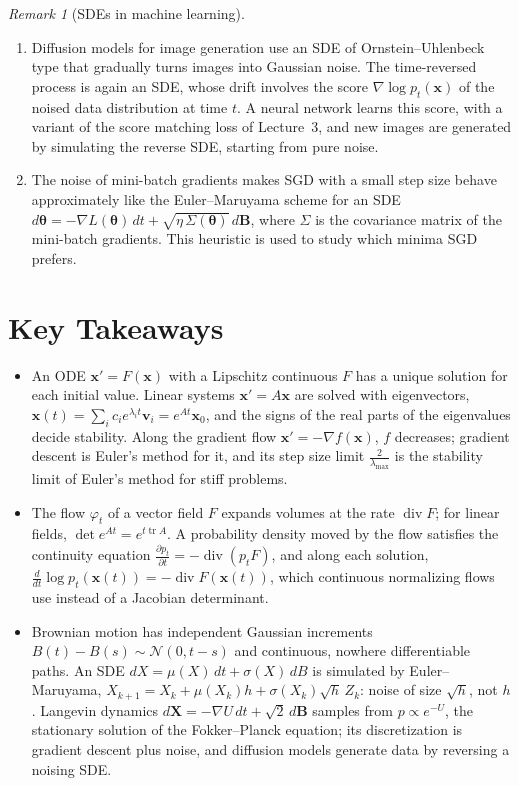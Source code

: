 \documentclass[11pt]{article}
\theoremstyle{definition}
\theoremstyle{plain}
\theoremstyle{remark}
\newtheorem{remark}[definition]{Remark}
\DeclareMathOperator{\tr}{tr}
\DeclareMathOperator{\Div}{div}
\begin{document}
\begin{remark}[SDEs in machine learning]
    \begin{enumerate}
        \item Diffusion models for image generation use an SDE of Ornstein--Uhlenbeck type that gradually turns images into Gaussian noise. The time-reversed process is again an SDE, whose drift involves the score $\nabla\log p_t(\mathbf{x})$ of the noised data distribution at time $t$. A neural network learns this score, with a variant of the score matching loss of Lecture~3, and new images are generated by simulating the reverse SDE, starting from pure noise.
        \item The noise of mini-batch gradients makes SGD with a small step size behave approximately like the Euler--Maruyama scheme for an SDE $d\boldsymbol{\theta} = -\nabla L(\boldsymbol{\theta})\,dt + \sqrt{\eta\,\Sigma(\boldsymbol{\theta})}\,d\mathbf{B}$, where $\Sigma$ is the covariance matrix of the mini-batch gradients. This heuristic is used to study which minima SGD prefers.
    \end{enumerate}
\end{remark}

\section{Key Takeaways}
\begin{itemize}[leftmargin=*]
    \item An ODE $\mathbf{x}' = F(\mathbf{x})$ with a Lipschitz continuous $F$ has a unique solution for each initial value. Linear systems $\mathbf{x}' = A\mathbf{x}$ are solved with eigenvectors, $\mathbf{x}(t) = \sum_i c_ie^{\lambda_i t}\mathbf{v}_i = e^{At}\mathbf{x}_0$, and the signs of the real parts of the eigenvalues decide stability. Along the gradient flow $\mathbf{x}' = -\nabla f(\mathbf{x})$, $f$ decreases; gradient descent is Euler's method for it, and its step size limit $\frac{2}{\lambda_{\max}}$ is the stability limit of Euler's method for stiff problems.
    \item The flow $\varphi_t$ of a vector field $F$ expands volumes at the rate $\Div F$; for linear fields, $\det e^{At} = e^{t\tr A}$. A probability density moved by the flow satisfies the continuity equation $\frac{\partial p_t}{\partial t} = -\Div(p_tF)$, and along each solution, $\frac{d}{dt}\log p_t(\mathbf{x}(t)) = -\Div F(\mathbf{x}(t))$, which continuous normalizing flows use instead of a Jacobian determinant.
    \item Brownian motion has independent Gaussian increments $B(t) - B(s) \sim \mathcal{N}(0, t - s)$ and continuous, nowhere differentiable paths. An SDE $dX = \mu(X)\,dt + \sigma(X)\,dB$ is simulated by Euler--Maruyama, $X_{k+1} = X_k + \mu(X_k)h + \sigma(X_k)\sqrt{h}\,Z_k$: noise of size $\sqrt{h}$, not $h$. Langevin dynamics $d\mathbf{X} = -\nabla U\,dt + \sqrt{2}\,d\mathbf{B}$ samples from $p \propto e^{-U}$, the stationary solution of the Fokker--Planck equation; its discretization is gradient descent plus noise, and diffusion models generate data by reversing a noising SDE.
\end{itemize}
\end{document}
